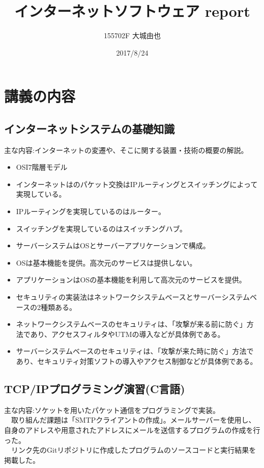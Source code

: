 \documentclass[11pt,a4paper]{jsarticle}
\begin{document}
\title{インターネットソフトウェア report}
\author{155702F 大城由也}
\date{2017/8/24}

\maketitle
\newpage
\section*{講義の内容}
\subsection*{インターネットシステムの基礎知識}
主な内容:インターネットの変遷や、そこに関する装置・技術の概要の解説。
\begin{itemize}
\item OSI7階層モデル
\item インターネットはのパケット交換はIPルーティングとスイッチングによって実現している。
\item IPルーティングを実現しているのはルーター。
\item スイッチングを実現しているのはスイッチングハブ。
\item サーバーシステムはOSとサーバーアプリケーションで構成。
\item OSは基本機能を提供。高次元のサービスは提供しない。
\item アプリケーションはOSの基本機能を利用して高次元のサービスを提供。
\item セキュリティの実装法はネットワークシステムベースとサーバーシステムベースの2種類ある。
\item ネットワークシステムベースのセキュリティは、「攻撃が来る前に防ぐ」方法であり、アクセスフィルタやUTMの導入などが具体例である。
\item サーバーシステムベースのセキュリティは、「攻撃が来た時に防ぐ」方法であり、セキュリティ対策ソフトの導入やアクセス制御などが具体例である。
\end{itemize}


\subsection*{TCP/IPプログラミング演習(C言語)}
主な内容:ソケットを用いたパケット通信をプログラミングで実装。\\
　取り組んだ課題は「SMTPクライアントの作成」。メールサーバーを使用し、自身のアドレスや用意されたアドレスにメールを送信するプログラムの作成を行った。\\
　リンク先のGitリポジトリに作成したプログラムのソースコードと実行結果を掲載した。
\end{document}

